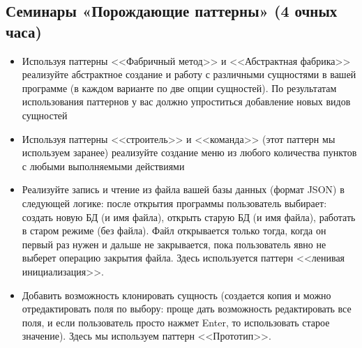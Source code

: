 \subsection{Семинары «Порождающие паттерны» (4 очных часа)}

\begin{itemize}
   \item Используя паттерны <<Фабричный метод>> и <<Абстрактная фабрика>> 
реализуйте абстрактное создание и работу с различными сущностями в вашей программе 
(в каждом варианте по две опции сущностей). 
По результатам использования паттернов у вас должно упроститься добавление новых видов
сущностей
   \item Используя паттерны <<строитель>> и <<команда>> (этот паттерн мы используем
   заранее) реализуйте создание меню из любого количества пунктов с любыми выполняемыми
   действиями
   \item Реализуйте запись и чтение из файла вашей базы данных (формат JSON)
   в следующей логике: 
   после открытия программы пользователь выбирает: создать новую БД (и имя файла), 
   открыть старую БД (и имя файла), работать в старом режиме (без файла). 
   Файл открывается только тогда, когда он первый раз нужен и дальше не закрывается, 
   пока пользователь явно не выберет операцию закрытия файла. Здесь используется паттерн
   <<ленивая инициализация>>. 
   \item Добавить возможность клонировать сущность (создается копия и можно отредактировать
   поля по выбору: проще дать возможность редактировать все поля, и если пользователь 
   просто нажмет Enter, то использовать старое значение). Здесь мы используем паттерн
   <<Прототип>>.
\end{itemize}